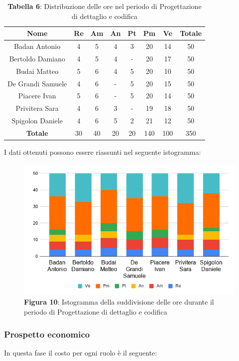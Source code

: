 \begin{table}[H]
	\centering
	\renewcommand{\arraystretch}{1.5}
	\begin{tabular}{|c|c|c|c|c|c|c|c|}
		\hline
		\rowcolor{lighter-grayer}
Nome & Re & Am & An & Pt & Pm & Ve & Totale \\ \hline
Badan Antonio & 4 & 5 & 4 & 3 & 20 & 14 & 50 \\ \hline
Bertoldo Damiano & 4 & 5 & 4 & - & 20 & 17 & 50 \\ \hline
Budai Matteo & 5 & 6 & 4 & 5 & 20 & 10 & 50 \\ \hline
De Grandi Samuele & 4 & 6 & - & 5 & 20 & 15 & 50 \\ \hline
Piacere Ivan & 5 & 6 & - & 5 & 20 & 14 & 50 \\ \hline
Privitera Sara & 4 & 6 & 3 & - & 19 & 18 & 50 \\ \hline
Spigolon Daniele & 4 & 6 & 5 & 2 & 21 & 12 & 50 \\ \hline
\textbf{Totale} & 30 & 40 & 20 & 20 & 140 & 100 & 350 \\ \hline
	\end{tabular}
	\caption*{\textbf{Tabella 6}: Distribuzione delle ore nel periodo di Progettazione di dettaglio e codifica\\}
\end{table}	
I dati ottenuti possono essere riassunti nel seguente istogramma:

\begin{figure}[H]
	\centering
	\includegraphics[width=0.7\linewidth]{res/images/IstogrammaFase3.png}
	\caption*{\textbf{Figura 10}: Istogramma della suddivisione delle ore durante il periodo di Progettazione di dettaglio e codifica}
	\label{fig:Figura10}
\end{figure}


\subsubsection{Prospetto economico}
In questa fase il costo per ogni ruolo è il seguente:

